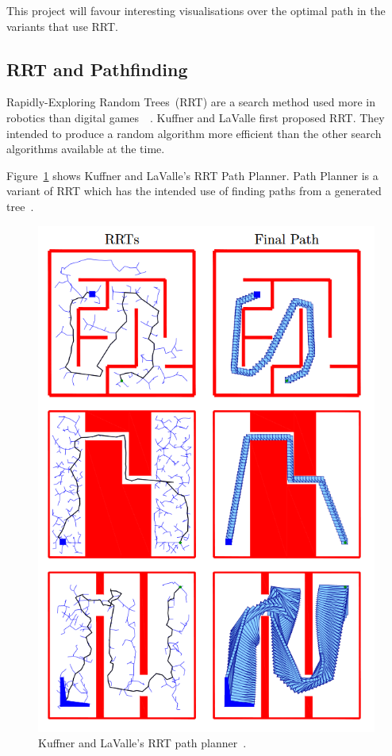\documentclass[journal]{IEEEtran}
\begin{document}
This project will favour interesting visualisations over the optimal path in the variants that use RRT. 


\subsection{RRT and Pathfinding}
Rapidly-Exploring Random Trees~(RRT) are a search method used more in robotics than digital games~\cite{LaValle1998}~\cite{Kuffner2000}.   Kuffner and LaValle first proposed RRT. They intended to produce a random algorithm more efficient than the other search algorithms available at the time. 

Figure~\ref{KuffnerRRT} shows  Kuffner and LaValle's RRT Path Planner. Path Planner is a variant of RRT which has the intended use of finding paths from a generated tree~\cite{Kuffner2000}.
\begin{figure}[h]
	\includegraphics[width=1.0\linewidth]{KuffnerRRT.png}
	\caption{ Kuffner and LaValle's RRT path planner~\cite{Kuffner2000}.}
	\label{KuffnerRRT}
\end{figure} 
\end{document}
